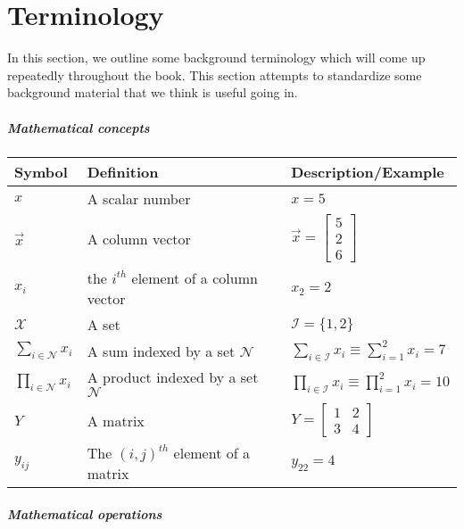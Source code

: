 
\chapter*{Terminology}

In this section, we outline some background terminology which will come up repeatedly throughout the book. This section attempts to standardize some background material that we think is useful going in.

\paragraph{Mathematical concepts}

\begin{tabular}{p{2cm} | p{4.5cm} | p{4cm}}
\hline
    Symbol & Definition & Description/Example \\
    \hline
     $x$ & A scalar number & $x = 5$   \\
     $\vec x$ & A column vector & $\vec x = \begin{bmatrix}5 \\ 2 \\ 6\end{bmatrix}$ \\
     $x_i$ & the $i^{th}$ element of a column vector & $x_2 = 2$ \\
     $\mathcal X$ & A set & $\mathcal I = \{1, 2\}$\\
     $\sum_{i \in \mathcal N} x_i$ & A sum indexed by a set $\mathcal N$ & $\sum_{i \in \mathcal I} x_i\equiv \sum_{i = 1}^2 x_i = 7$ \\
     $\prod_{i \in \mathcal N}x_i$ & A product indexed by a set $\mathcal N$ & $\prod_{i \in \mathcal I} x_i \equiv \prod_{i = 1}^2 x_i = 10$ \\
     $Y$ & A matrix & $Y = \begin{bmatrix}1 & 2 \\ 3 & 4\end{bmatrix}$ \\
     $y_{ij}$ & The $(i, j)^{th}$ element of a matrix & $y_{22} = 4$ \\
     \hline
\end{tabular}


\paragraph{Mathematical operations}

